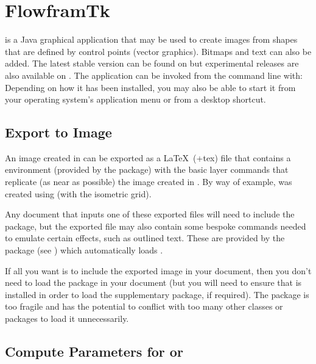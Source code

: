 \documentclass[fontsize=12pt]{scrbook}
\begin{document}
\chapter{FlowframTk}\label{sec:flowframtk}

 is a Java graphical application that may be used to
create images from shapes that are defined by control points
(vector graphics). Bitmaps and text can also be added.
The latest stable version can be found on  but
experimental releases are also available 
on .
The application can be invoked from the command line with:
Depending on how it has been installed, you may also be able to
start it from your operating system's application menu or from a
desktop shortcut.

\section{Export to Image}\label{sec:exporttoimage}

An image created in  can be exported as a \LaTeX\
(\ext+{tex}) file that contains a  environment
(provided by the  package) with the basic layer commands
that replicate (as near as possible) the image created in
. By way of example,  was
created using \idx{FlowframTk} (with the isometric grid).

Any document that inputs one of these exported files will need to
include the \sty{pgf} package, but the exported file may also
contain some bespoke commands needed to emulate certain effects,
such as outlined text. These are provided by the
 package (see
) which automatically loads . 

If all you want is to include the exported image in your document,
then you don't need to load the  package in your document
(but you will need to ensure that \sty{flowfram} is installed in
order to load the supplementary \sty{flowframtkutils} package, if
required).
The  package is too fragile and has the potential to
conflict with too many other classes or packages to load it unnecessarily.

\section{Compute Parameters for  or
}
\label{sec:computeparshape}
\end{document}
